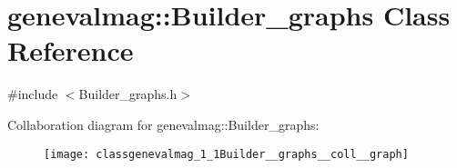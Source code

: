\hypertarget{classgenevalmag_1_1Builder__graphs}{
\section{genevalmag::Builder\_\-graphs Class Reference}
\label{classgenevalmag_1_1Builder__graphs}
}


{\ttfamily \#include $<$Builder\_\-graphs.h$>$}



Collaboration diagram for genevalmag::Builder\_\-graphs:\nopagebreak
\begin{figure}[H]
\begin{center}
\leavevmode
\texttt{[image: classgenevalmag\_1\_1Builder\_\_graphs\_\_coll\_\_graph]}
\end{center}
\end{figure}
